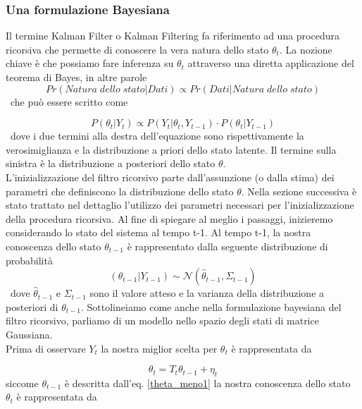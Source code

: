\documentclass[]{article}
\begin{document}
\subsubsection{Una formulazione Bayesiana}

Il termine Kalman Filter o Kalman Filtering fa riferimento ad una procedura ricorsiva che permette di conoscere la vera natura dello stato $\theta_t$. La nozione chiave è che possiamo fare inferenza su $\theta_t$ attraverso una diretta applicazione del teorema di Bayes, in altre parole 
\begin{equation}
	Pr(Natura \; dello \; stato| Dati) \propto Pr(Dati| Natura\; dello \; stato)
\end{equation}
\
che può essere scritto come 

\begin{equation}
	P(\theta_t|Y_t) \propto P(Y_t| \theta_t,Y_{t-1}) \cdot P(\theta_t|Y_{t-1})
	\label{dist_post}
\end{equation}
\
dove i due termini alla destra dell'equazione sono rispettivamente la verosimiglianza e la distribuzione a priori dello stato latente. Il termine sulla sinistra è la distribuzione a posteriori dello stato $\theta$.
\\
L'inizializzazione del filtro ricorsivo parte dall'assunzione (o dalla stima) dei parametri che definiscono la distribuzione dello stato $\theta$. Nella sezione successiva è stato trattato nel dettaglio l'utilizzo dei parametri necessari per l'inizializzazione della procedura ricorsiva.
Al fine di spiegare al meglio i passaggi, inizieremo considerando lo stato del sistema al tempo t-1.
Al tempo t-1, la nostra conoscenza dello stato $\theta_{t-1}$ è rappresentato dalla seguente distribuzione di probabilità
\begin{equation}
	(\theta_{t-1}|Y_{t-1}) \sim \mathcal{N}(\hat{\theta}_{t-1},\Sigma_{t-1})
	\label{theta_meno1}
\end{equation} 
\
dove $\hat{\theta}_{t-1}$ e $\Sigma_{t-1}$ sono il valore atteso e la varianza della distribuzione a posteriori di $\theta_{t-1}$.
Sottolineiamo come anche nella formulazione bayesiana del filtro ricorsivo, parliamo di un modello nello spazio degli stati di matrice Gaussiana.
\\
Prima di osservare $Y_t$ la nostra miglior scelta per $\theta_t$ è rappresentata da

\begin{equation}
	\theta_t = T_t \theta_{t-1} + \eta_t
\end{equation}
siccome $\theta_{t-1}$ è descritta dall'eq. \ref{theta_meno1} la nostra conoscenza dello stato $\theta_t$ è rappresentata da
\end{document}
